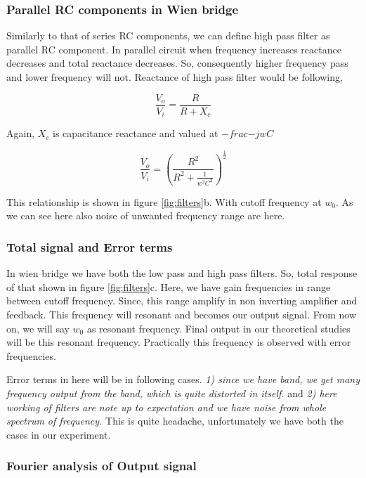 \documentclass[14pt,a4paper]{extarticle}
\begin{document}
\subsubsection{Parallel RC components in Wien bridge}
\label{sec:org38bb3b7}
Similarly to that of series RC components, we can define high pass filter as parallel RC component. In parallel circuit when frequency increases reactance decreases and total reactance decreases. So, consequently higher frequency pass and lower frequency will not. Reactance of high pass filter would be following, 


\begin{equation*}
\frac{V_o}{V_i}= \frac{R}{R+X_c}
\end{equation*}

Again, \(X_c\) is capacitance reactance and valued at \(-frac{-j}{wC}\)

\begin{equation*}
\frac{V_o}{V_i}=\left(\frac{R^2}{R^2+\frac{1}{w^2C^2}}\right)^{\frac{1}{2}}
\end{equation*}

This relationship is shown in figure \ref{fig:filters}b. With cutoff frequency at \(w_0\). As we can see here also noise of unwanted frequency range are here. 


\subsubsection{Total signal and Error terms}
\label{sec:orgc45a2a4}
In wien bridge we have both the low pass and high pass filters. So, total response of that shown in figure \ref{fig:filters}c. Here, we have gain frequencies in range between cutoff frequency. Since, this range amplify in non inverting amplifier and feedback. This frequency will resonant and becomes our output signal. From now on, we will say \(w_0\) as resonant frequency. Final output in our theoretical studies will be this resonant frequency. Practically this frequency is observed with error frequencies.

Error terms in here will be in following cases. \emph{1) since we have band, we get many frequency output from the band, which is quite distorted in itself.} and \emph{2) here working of filters are note up to expectation and we have noise from whole spectrum of frequency.} This is quite headache, unfortunately we have both the cases in our experiment. 


\subsubsection{Fourier analysis of Output signal}
\label{sec:org01b21a4}
\end{document}
